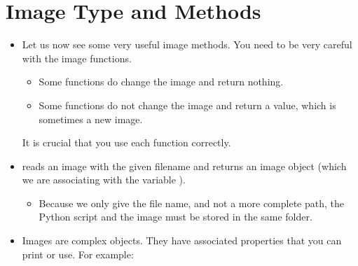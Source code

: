 \documentclass[letterpaper,10pt,english]{sphinxmanual}
\begin{document}
\section{Image Type and Methods}
\label{\detokenize{lecture_notes/lec07_modules_images:image-type-and-methods}}\begin{itemize}
\item {} 
Let us now see some very useful image methods. You need to be very
careful with the image functions.
\begin{itemize}
\item {} 
Some functions do change the
image and return nothing.

\item {} 
Some functions do not change the image and return a value, which
is sometimes a new image.

\end{itemize}

It is crucial that you use each function correctly.

\item {} 
 reads an image with the given filename
and returns an image object (which we are associating with the variable
).
\begin{itemize}
\item {} 
Because we only give the file name, and not a more complete
path, the Python script and the image must be stored in the
same folder.

\end{itemize}

\item {} 
Images are complex objects. They have associated properties
that you can print or use.  For example:

\begin{sphinxVerbatim}[commandchars=\\\{\}]
  
\end{sphinxVerbatim}


\end{itemize}
\end{document}
